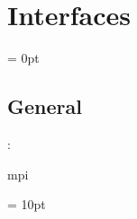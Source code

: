
\section{Interfaces} 


\parskip = 0pt

\vspace{3mm} \subsection*{General}

: 

mpi
\vspace{2mm}

\vspace{5mm}\parskip = 10pt 
